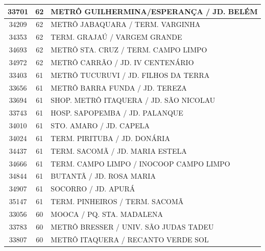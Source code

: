 \documentclass[
	12pt,				%
	oneside,			%
	a4paper,			%
	english,			%
	brazil				%
	]{abntex2ppgsi}
\begin{document}
\begin{apendicesenv}
\begin{longtable}{c|c|p{7cm}}
    33701 & 62    & METRÔ GUILHERMINA/ESPERANÇA / JD. BELÉM \\
\hline

    34209 & 62    & METRÔ JABAQUARA / TERM. VARGINHA \\
\hline

    34353 & 62    & TERM. GRAJAÚ / VARGEM GRANDE \\
\hline

    34693 & 62    & METRÔ STA. CRUZ / TERM. CAMPO LIMPO \\
\hline

    34972 & 62    & METRÔ CARRÃO / JD. IV CENTENÁRIO \\
\hline

    33403 & 61    & METRÔ TUCURUVI / JD. FILHOS DA TERRA \\
\hline

    33656 & 61    & METRÔ BARRA FUNDA / JD. TEREZA \\
\hline

    33694 & 61    & SHOP. METRÔ ITAQUERA / JD. SÃO NICOLAU \\
\hline

    33743 & 61    & HOSP. SAPOPEMBA / JD. PALANQUE \\
\hline

    34010 & 61    & STO. AMARO / JD. CAPELA \\
\hline

    34024 & 61    & TERM. PIRITUBA / JD. DONÁRIA \\
\hline

    34437 & 61    & TERM. SACOMÃ / JD. MARIA ESTELA \\
\hline

    34666 & 61    & TERM. CAMPO LIMPO / INOCOOP CAMPO LIMPO \\
\hline

    34844 & 61    & BUTANTÃ / JD. ROSA MARIA \\
\hline

    34907 & 61    & SOCORRO / JD. APURÁ \\
\hline

    35147 & 61    & TERM. PINHEIROS / TERM. SACOMÃ \\
\hline

    33056 & 60    & MOOCA / PQ. STA. MADALENA \\
\hline

    33783 & 60    & METRÔ BRESSER / UNIV. SÃO JUDAS TADEU \\
\hline

    33807 & 60    & METRÔ ITAQUERA / RECANTO VERDE SOL \\
\hline


\end{longtable}
\end{apendicesenv}
\end{document}
